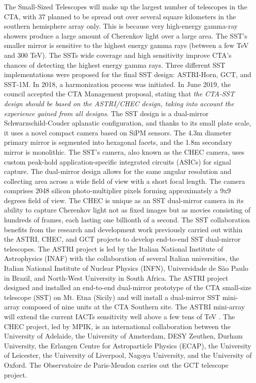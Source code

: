 The Small-Sized Telescopes will make up the largest number of telescopes in the CTA, with 37 planned to be spread out over several square kilometers in the southern hemisphere array only. This is because very high-energy gamma-ray showers produce a large amount of Cherenkov light over a large area. The SST's smaller mirror is sensitive to the highest energy gamma rays (between a few TeV and 300 TeV). The SSTs wide coverage and high sensitivity improve CTA's chances of detecting the highest energy gamma rays. Three different SST implementations were proposed for the final SST design: ASTRI-Horn, GCT, and SST-1M. In 2018, a harmonization process was initiated. In June 2019, the council accepted the CTA Management proposal, stating that \textit{the CTA-SST design should be based on the ASTRI/CHEC design, taking into account the experience gained from all designs}. The SST design is a dual-mirror Schwarzschild-Couder aplanatic configuration, and thanks to its small plate scale, it uses a novel compact camera based on SiPM sensors. The 4.3m diameter primary mirror is segmented into hexagonal facets, and the 1.8m secondary mirror is monolithic. The SST's camera, also known as the CHEC camera, uses custom peak-hold application-specific integrated circuits (ASICs) for signal capture. The dual-mirror design allows for the same angular resolution and collecting area across a wide field of view with a short focal length. The camera comprises 2048 silicon photo-multiplier pixels forming approximately a 9x9 degrees field of view. The CHEC is unique as an SST dual-mirror camera in its ability to capture Cherenkov light not as fixed images but as movies consisting of hundreds of frames, each lasting one billionth of a second. The SST collaboration benefits from the research and development work previously carried out within the ASTRI, CHEC, and GCT projects to develop end-to-end SST dual-mirror telescopes. The ASTRI project is led by the Italian National Institute of Astrophysics (INAF) with the collaboration of several Italian universities, the Italian National Institute of Nuclear Physics (INFN), Universidade de São Paulo in Brazil, and North-West University in South Africa. 
The ASTRI project designed and installed an end-to-end dual-mirror prototype of the CTA small-size telescope (SST) on Mt. Etna (Sicily) and will install a dual-mirror SST mini-array composed of nine units at the CTA Southern site.
The ASTRI mini-array will extend the current IACTs sensitivity well above a few tens of TeV \cite{Vercellone_2016}. The CHEC project, led by MPIK, is an international collaboration between the University of Adelaide, the University of Amsterdam, DESY Zeuthen, Durham University, the Erlangen Centre for Astroparticle Physics (ECAP), the University of Leicester, the University of Liverpool, Nagoya University, and the University of Oxford. The Observatoire de Paris-Meudon carries out the GCT telescope project.

